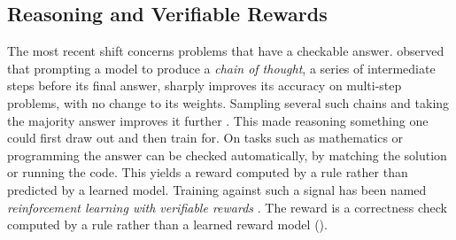 \subsection{Reasoning and Verifiable Rewards}

The most recent shift concerns problems that have a checkable answer.
\citet{wei2022chain} observed that prompting a model to produce a \emph{chain of
thought}, a series of intermediate steps before its final answer, sharply improves its
accuracy on multi-step problems, with no change to its weights. Sampling several such
chains and taking the majority answer improves it further
\citep{wang2023selfconsistency}. This made reasoning something one could first draw out
and then train for. On tasks such as mathematics or programming the answer can be
checked automatically, by matching the solution or running the code. This yields a
reward computed by a rule rather than predicted by a learned model. Training against
such a signal has been named \emph{reinforcement learning with verifiable rewards}
\citep{lambert2024tulu3}. The reward is a correctness check computed by a rule rather than a
learned reward model ().

